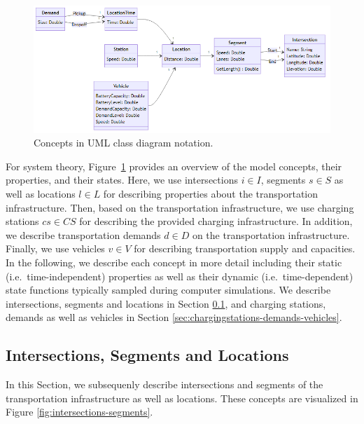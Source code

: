 \documentclass[graybox]{svmult}
\begin{document}
\begin{figure}[t] 
	\centering
	\includegraphics[scale=0.30]{../../diagrams/model/classes-v0.png}
	\caption{Concepts in UML class diagram notation.}
	\label{fig:concepts}
\end{figure}
For system theory, Figure~\ref{fig:concepts} provides an overview of the model concepts, their properties, and their states.
Here, we use intersections $i \in I$, segments $s \in S$ as well as locations $l \in L$ for describing properties about the transportation infrastructure.
Then, based on the transportation infrastructure, we use charging stations $cs \in CS$ for describing the provided charging infrastructure.
In addition, we describe transportation demands $d \in D$ on the transportation infrastructure. 
Finally, we use vehicles $v \in V$ for describing transportation supply and capacities.
In the following, we describe each concept in more detail including their static (i.e.\ time-independent) properties as well as their dynamic (i.e.\ time-dependent) state functions typically sampled during computer simulations. We describe intersections, segments and locations in Section \ref{sec:intersections-segments}, and charging stations, demands as well as vehicles in Section \ref{sec:chargingstations-demands-vehicles}.

\vspace{-2mm}
\subsection{Intersections, Segments and Locations}
\label{sec:intersections-segments}
In this Section, we subsequenly describe intersections and segments of the transportation infrastructure as well as locations. These concepts are visualized in Figure \ref{fig:intersections-segments}.
\end{document}
